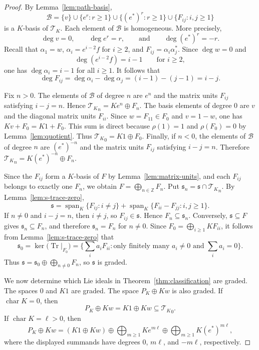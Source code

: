 \documentclass[11pt]{article}
\numberwithin{equation}{section}
\theoremstyle{plain}
\theoremstyle{definition}
\numberwithin{equation}{section}
\newcommand{\T}{\mathscr T_K}
\begin{document}
\begin{proof}
By Lemma~\ref{lem:path-basis},
$$
\mathcal B=\{v\}\cup\{e^r:r\geq1\}\cup\{(e^*)^r:r\geq1\}\cup\{F_{ij}:i,j\geq1\}
$$
is a $K$-basis of $\T$. Each element of $\mathcal B$ is homogeneous. More precisely,
$$
\deg v=0,\qquad \deg e^r=r,\qquad\text{and}\qquad \deg (e^*)^r=-r.
$$
Recall that $\alpha_1=w$, $\alpha_i=e^{i-2}f$ for $i\geq2$, and $F_{ij}=\alpha_i\alpha_j^*$. Since $\deg w=0$ and
$$
\deg(e^{i-2}f)=i-1\qquad\text{for }i\geq2,
$$
one has $\deg\alpha_i=i-1$ for all $i\geq1$. It follows that
$$
\deg F_{ij}=\deg\alpha_i-\deg\alpha_j=(i-1)-(j-1)=i-j.
$$

Fix $n>0$. The elements of $\mathcal B$ of degree $n$ are $e^n$ and the matrix units $F_{ij}$ satisfying $i-j=n$. Hence ${\T}_n=Ke^n\oplus F_n$. The basis elements of degree $0$ are $v$ and the diagonal matrix units $F_{ii}$. Since $w=F_{11}\in F_0$ and $v=1-w$, one has $Kv+F_0=K1+F_0$. This sum is direct because $\rho(1)=1$ and $\rho(F_0)=0$ by Lemma~\ref{lem:quotient}. Thus ${\T}_0=K1\oplus F_0$. Finally, if $n<0$, the elements of $\mathcal B$ of degree $n$ are $(e^*)^{-n}$ and the matrix units $F_{ij}$ satisfying $i-j=n$. Therefore ${\T}_n=K(e^*)^{-n}\oplus F_n$.

Since the $F_{ij}$ form a $K$-basis of $F$ by Lemma~\ref{lem:matrix-units}, and each $F_{ij}$ belongs to exactly one $F_n$, we obtain $F=\bigoplus_{n\in\mathbb Z}F_n$. Put $\mathfrak s_n=\mathfrak s\cap{\T}_n$. By Lemma~\ref{lem:s-trace-zero},
$$
\mathfrak s=\operatorname{span}_K\{F_{ij}:i\neq j\}
+\operatorname{span}_K\{F_{ii}-F_{jj}:i,j\geq1\}.
$$
If $n\neq0$ and $i-j=n$, then $i\neq j$, so $F_{ij}\in\mathfrak s$. Hence $F_n\subseteq\mathfrak s_n$. Conversely, $\mathfrak s\subseteq F$ gives $\mathfrak s_n\subseteq F_n$, and therefore $\mathfrak s_n=F_n$ for $n\neq0$.
Since $F_0=\bigoplus_{i\geq1}KF_{ii}$, it follows from  Lemma~\ref{lem:s-trace-zero} that
$$
\mathfrak s_0
=\ker\bigl(\operatorname{Tr}|_{F_0}\bigr)
=\Big\{\sum_i a_iF_{ii}:\text{only finitely many }a_i\neq0
\text{ and }\sum_i a_i=0\Big\}.
$$
Thus $\mathfrak s=\mathfrak s_0\oplus\bigoplus_{n\neq0}F_n$, so $\mathfrak s$ is graded.

We now determine which Lie ideals in Theorem~\ref{thm:classification} are graded. The spaces $0$ and $K1$ are graded. The space $P_K\oplus Kw$ is also graded. If $\operatorname{char}K=0$, then
$$
P_K\oplus Kw=K1\oplus Kw\subseteq{\T}_0.
$$
If $\operatorname{char}K=\ell>0$, then
$$
P_K\oplus Kw
=(K1\oplus Kw)
\oplus\bigoplus_{m\geq1}Ke^{m\ell}
\oplus\bigoplus_{m\geq1}K(e^*)^{m\ell},
$$
where the displayed summands have degrees $0$, $m\ell$, and $-m\ell$, respectively.


\end{proof}
\end{document}
